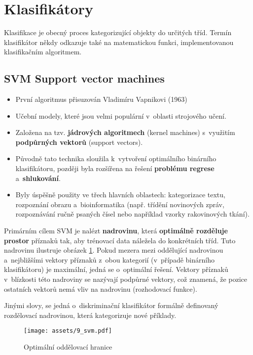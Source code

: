 \section{Klasifikátory}
Klasifikace je obecný proces kategorizující objekty do určitých tříd. Termín klasifikátor někdy odkazuje také na matematickou funkci, implementovanou klasifikačním algoritmem.
\subsection*{SVM Support vector machines} %
\begin{itemize}
    \item První algoritmus přisuzován Vladimíru Vapnikovi (1963)
    \item Učební modely, které jsou velmi populární v~oblasti strojového učení.
    \item Založena na tzv. \textbf{jádrových algoritmech} (kernel machines) s~využitím \textbf{podpůrných vektorů} (support vectors).
    \item Původně tato technika sloužila k~vytvoření optimálního binárního klasifikátoru, později byla rozšířena na řešení \textbf{problému regrese} a~\textbf{shlukování}.
    \item Byly úspěšně použity ve třech hlavních oblastech: kategorizace textu, rozpoznání obrazu a~bioinformatika (např. třídění novinových zpráv, rozpoznávání ručně psaných čísel nebo například vzorky rakovinových tkání).
\end{itemize}

Primárním cílem SVM je nalézt \textbf{nadrovinu}, která \textbf{optimálně rozděluje prostor} příznaků tak, aby trénovací data náležela do konkrétních tříd. Tuto nadrovinu ilustruje obrázek \ref{fig:svm}. Pokud mezera mezi oddělující nadrovinou a~nejbližšími vektory příznaků z~obou kategorií (v~případě binárního klasifikátoru) je maximální, jedná se o~optimální řešení. Vektory příznaků v~blízkosti této nadroviny se nazývají podpůrné vektory, což znamená, že pozice ostatních vektorů nemá vliv na nadrovinu (rozhodovací funkce).

Jinými slovy, se jedná o~diskriminační klasifikátor formálně definovaný rozdělovací nadrovinou, která kategorizuje nové příklady.
\begin{figure}[H]
    \centering
    \texttt{[image: assets/9\_svm.pdf]}
    \caption{Optimální oddělovací hranice}
    \label{fig:svm}
\end{figure}

